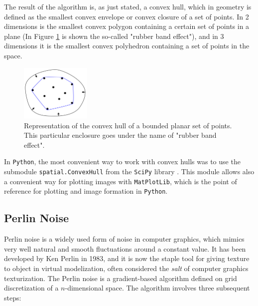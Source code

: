 The result of the algorithm is, as just stated, a convex hull, which in geometry is defined as the smallest convex envelope or convex closure of a set of points. In 2 dimensions is the smallest convex polygon containing a certain set of points in a plane (In Figure \ref{fig:conv_hull} is shown the so-called "rubber band effect"), and in 3 dimensions it is the smallest convex polyhedron containing a set of points in the space.

\begin{figure}
    \centering
    \includegraphics[width = 0.3\textwidth]{images/conv_hull}
    \caption{Representation of the convex hull of a bounded planar set of points. This particular enclosure goes under the name of "rubber band effect".}
    \label{fig:conv_hull}
\end{figure}

In \texttt{Python}, the most convenient way to work with convex hulls was to use the submodule \texttt{spatial.ConvexHull} from the \texttt{SciPy} library \cite{2020SciPy-NMeth}. This module allows also a convenient way for plotting images with \texttt{MatPlotLib}, which is the point of reference for plotting and image formation in \texttt{Python}.

\subsection{Perlin Noise} \label{ssec:perlin}
Perlin noise is a widely used form of noise in computer graphics, which mimics very well natural and smooth fluctuations around a constant value. It has been developed by Ken Perlin in 1983, and it is now the staple tool for giving texture to object in virtual modelization, often considered the \textit{salt} of computer graphics texturization.
The Perlin noise is a gradient-based algorithm defined on grid discretization of a $n$-dimensional space. The algorithm involves three subsequent steps:

